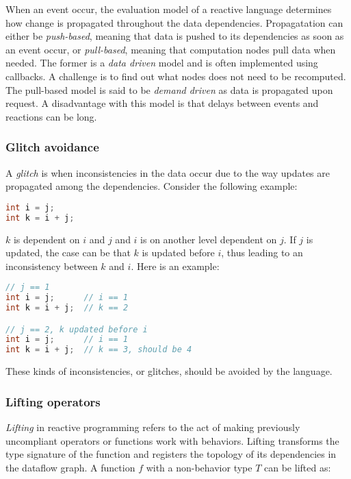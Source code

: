 When an event occur, the evaluation model of a reactive language determines how
change is propagated throughout the data dependencies. Propagatation can either
be \textit{push-based}, meaning that data is pushed to its dependencies as soon
as an event occur, or \textit{pull-based}, meaning that computation nodes pull
data when needed. The former is a \textit{data driven} model and is often implemented
using callbacks. A challenge is to find out what nodes does not need to be
recomputed. The pull-based model is said to be \textit{demand driven} as data
is propagated upon request. A disadvantage with this model is that delays
between events and reactions can be long.

\subsubsection{Glitch avoidance}

A \textit{glitch} is when inconsistencies in the data occur due to the way
updates are propagated among the dependencies. Consider the following example:

\begin{lstlisting}[language=C]
int i = j;
int k = i + j;
\end{lstlisting}

$k$ is dependent on $i$ and $j$ and $i$ is on another level dependent on
$j$. If $j$ is updated, the case can be that $k$ is updated before $i$, thus
leading to an inconsistency between $k$ and $i$. Here is an example:


\begin{lstlisting}[language=C]
// j == 1
int i = j;      // i == 1
int k = i + j;  // k == 2

// j == 2, k updated before i
int i = j;      // i == 1
int k = i + j;  // k == 3, should be 4
\end{lstlisting}

These kinds of inconsistencies, or glitches, should be avoided by the language.

\subsubsection{Lifting operators}

\textit{Lifting} in reactive programming refers to the act of making previously
uncompliant operators or functions work with behaviors. Lifting transforms the
type signature of the function and registers the topology of its dependencies
in the dataflow graph. A function $f$ with a non-behavior type $T$ can be
lifted as:


